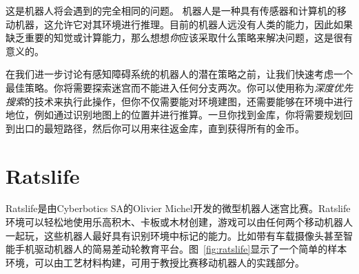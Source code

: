 这是机器人将会遇到的完全相同的问题。 机器人是一种具有传感器和计算机的移动机器，这允许它对其环境进行推理。目前的机器人远没有人类的能力，因此如果缺乏重要的知觉或计算能力，那么想想\emph{你}应该采取什么策略来解决问题，这是很有意义的。


在我们进一步讨论有感知障碍系统的机器人的潜在策略之前，让我们快速考虑一个最佳策略。你将需要探索迷宫而不能进入任何分支两次。你可以使用称为\emph{深度优先搜索}的技术来执行此操作，但你不仅需要能对环境建图，还需要能够在环境中进行地位，例如通过识别地图上的位置并进行推算。一旦你找到金库，你将需要规划回到出口的最短路径，然后你可以用来往返金库，直到获得所有的金币。

\section{Ratslife}\label{sec:ratslife}

Ratslife是由Cyberbotics SA的Olivier Michel开发的微型机器人迷宫比赛。Ratslife环境可以轻松地使用乐高积木、卡板或木材创建，游戏可以由任何两个移动机器人一起玩，这些机器人最好具有识别环境中标记的能力。比如带有车载摄像头甚至智能手机驱动机器人的简易差动轮教育平台。图~\ref{fig:ratslife}显示了一个简单的样本环境，可以由工艺材料构建，可用于教授比赛移动机器人的实践部分。

